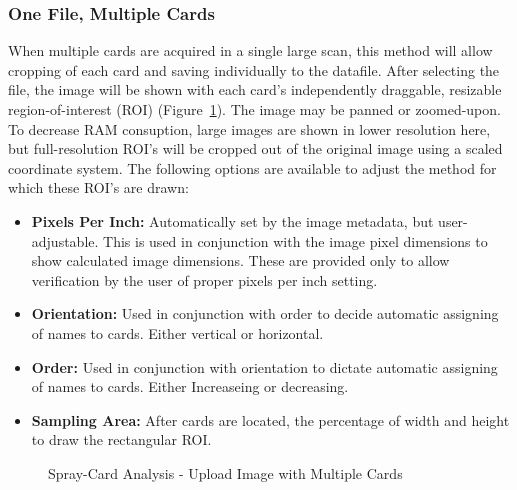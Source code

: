 \documentclass[10pt,letterpaper,titlepage]{article}
\begin{document}
    \subsubsection{One File, Multiple Cards}
    When multiple cards are acquired in a single large scan, this method will allow cropping of each card and saving individually to the datafile. After selecting the file, the image will be shown with each card's independently draggable, resizable region-of-interest (ROI) (Figure~\ref{fig:card_upload_multiple}). The image may be panned or zoomed-upon. To decrease RAM consuption, large images are shown in lower resolution here, but full-resolution ROI's will be cropped out of the original image using a scaled coordinate system. The following options are available to adjust the method for which these ROI's are drawn:
    \begin{itemize}
        \item \textbf{Pixels Per Inch:} Automatically set by the image metadata, but user-adjustable. This is used in conjunction with the image pixel dimensions to show calculated image dimensions. These are provided only to allow verification by the user of proper pixels per inch setting.
        \item \textbf{Orientation:} Used in conjunction with order to decide automatic assigning of names to cards. Either vertical or horizontal.
        \item \textbf{Order:} Used in conjunction with orientation to dictate automatic assigning of names to cards. Either Increaseing or decreasing.
        \item \textbf{Sampling Area:} After cards are located, the percentage of width and height to draw the rectangular ROI.
    \end{itemize}
    \begin{figure}[hb]
        \centering
        \caption{Spray-Card Analysis - Upload Image with Multiple Cards}
        \label{fig:card_upload_multiple}
    \end{figure}
    \FloatBarrier
\end{document}
